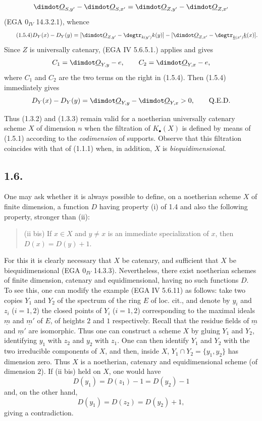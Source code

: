 %

\[
\dimdot\underline{O}_{S,y'}-\dimdot\underline{O}_{S,x'}=\dimdot\underline{O}_{Z,y'}-\dimdot\underline{O}_{Z,x'}
\]
(EGA $0_{IV}$ 14.3.2.1), whence
\begin{equation}\tag{1.5.4}
D_Y(x)-D_Y(y)=
[\dimdot\underline{O}_{Z,y'}-\degtr_{k(y')}k(y)]-[\dimdot\underline{O}_{Z,x'}-\degtr_{\underline{k}(x')}\underline{k}(x)].
\end{equation}
Since $Z$ is universally catenary, (EGA IV 5.6.5.1.) applies and gives
\[
C_1=\dimdot\underline{O}_{Y,y}-e,\qquad C_2=\dimdot\underline{O}_{Y,x}-e,
\]
where $C_1$ and $C_2$ are the two terms on the right in (1.5.4). Then (1.5.4) immediately gives
\[
D_Y(x)-D_Y(y)=\dimdot\underline{O}_{Y,y}-\dimdot\underline{O}_{Y,x}>0,\qquad \text{Q.E.D.}
\]

Thus (1.3.2) and (1.3.3) remain valid for a noetherian universally catenary scheme $X$ of dimension $n$ when the filtration of $K_\bullet(X)$ is defined by means of (1.5.1) according to the \emph{codimension} of supports. Observe that this filtration coincides with that of (1.1.1) when, in addition, $X$ is \emph{biequidimensional}.

\subsection*{1.6.}
One may ask whether it is always possible to define, on a noetherian scheme $X$ of finite dimension, a function $D$ having property (i) of 1.4 and also the following property, stronger than (ii):
\begin{quote}
(ii bis) If $x\in X$ and $y\ne x$ is an immediate specialization of $x$, then $D(x)=D(y)+1$.
\end{quote}


%

For this it is clearly necessary that $X$ be catenary, and sufficient that $X$ be biequidimensional (EGA $0_{IV}$ 14.3.3). Nevertheless, there exist noetherian schemes of finite dimension, catenary and equidimensional, having no such functions $D$. To see this, one can modify the example (EGA IV 5.6.11) as follows: take two copies $Y_1$ and $Y_2$ of the spectrum of the ring $E$ of loc. cit., and denote by $y_i$ and $z_i$ ($i=1,2$) the closed points of $Y_i$ ($i=1,2$) corresponding to the maximal ideals $\underline{m}$ and $\underline{m}'$ of $E$, of heights $2$ and $1$ respectively. Recall that the residue fields of $\underline{m}$ and $\underline{m}'$ are isomorphic. Thus one can construct a scheme $X$ by gluing $Y_1$ and $Y_2$, identifying $y_1$ with $z_2$ and $y_2$ with $z_1$. One can then identify $Y_1$ and $Y_2$ with the two irreducible components of $X$, and then, inside $X$, $Y_1\cap Y_2=\{y_1,y_2\}$ has dimension zero. Thus $X$ is a noetherian, catenary and equidimensional scheme (of dimension $2$). If (ii bis) held on $X$, one would have
\[
D(y_1)=D(z_1)-1=D(y_2)-1
\]
and, on the other hand,
\[
D(y_1)=D(z_2)=D(y_2)+1,
\]
giving a contradiction.


